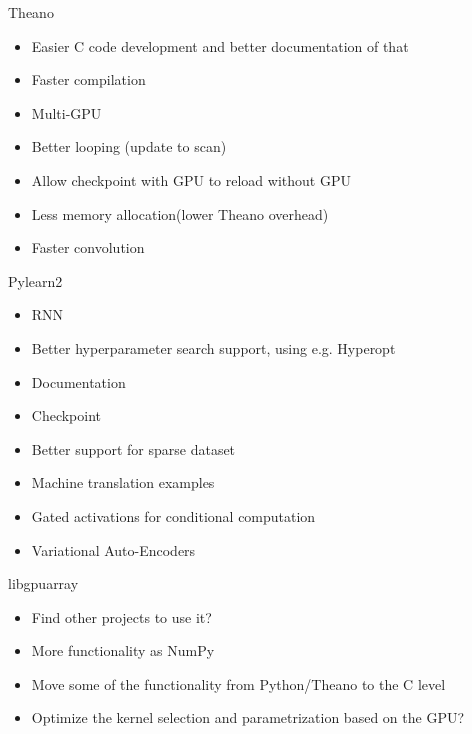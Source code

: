 \documentclass[utf8x,xcolor=pdftex,dvipsnames,table]{beamer}
\begin{document}
\begin{frame}{Theano}
\begin{itemize}
\item Easier C code development and better documentation of that
\item Faster compilation
\item Multi-GPU
\item Better looping (update to scan)
\item Allow checkpoint with GPU to reload without GPU
\item Less memory allocation(lower Theano overhead)
\item Faster convolution
\end{itemize}
\end{frame}

\begin{frame}{Pylearn2}
\begin{itemize}
\item RNN
\item Better hyperparameter search support, using e.g. Hyperopt
\item Documentation
\item Checkpoint
\item Better support for sparse dataset
\item Machine translation examples
\item Gated activations for conditional computation
\item Variational Auto-Encoders
\end{itemize}
\end{frame}

\begin{frame}{libgpuarray}
\begin{itemize}
\item Find other projects to use it?
\item More functionality as NumPy
\item Move some of the functionality from Python/Theano to the C level
\item Optimize the kernel selection and parametrization based on the GPU?
\end{itemize}
\end{frame}
\end{document}
